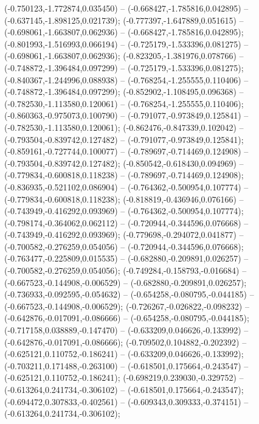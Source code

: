 (-0.750123,-1.772874,0.035450) -- (-0.668427,-1.785816,0.042895) -- (-0.637145,-1.898125,0.021739);
 (-0.777397,-1.647889,0.051615) -- (-0.698061,-1.663807,0.062936) -- (-0.668427,-1.785816,0.042895);
 (-0.801993,-1.516993,0.066194) -- (-0.725179,-1.533396,0.081275) -- (-0.698061,-1.663807,0.062936);
 (-0.823205,-1.381976,0.078766) -- (-0.748872,-1.396484,0.097299) -- (-0.725179,-1.533396,0.081275);
 (-0.840367,-1.244996,0.088938) -- (-0.768254,-1.255555,0.110406) -- (-0.748872,-1.396484,0.097299);
 (-0.852902,-1.108495,0.096368) -- (-0.782530,-1.113580,0.120061) -- (-0.768254,-1.255555,0.110406);
 (-0.860363,-0.975073,0.100790) -- (-0.791077,-0.973849,0.125841) -- (-0.782530,-1.113580,0.120061);
 (-0.862476,-0.847339,0.102042) -- (-0.793504,-0.839742,0.127482) -- (-0.791077,-0.973849,0.125841);
 (-0.859161,-0.727744,0.100077) -- (-0.789697,-0.714469,0.124908) -- (-0.793504,-0.839742,0.127482);
 (-0.850542,-0.618430,0.094969) -- (-0.779834,-0.600818,0.118238) -- (-0.789697,-0.714469,0.124908);
 (-0.836935,-0.521102,0.086904) -- (-0.764362,-0.500954,0.107774) -- (-0.779834,-0.600818,0.118238);
 (-0.818819,-0.436946,0.076166) -- (-0.743949,-0.416292,0.093969) -- (-0.764362,-0.500954,0.107774);
 (-0.798174,-0.364062,0.062112) -- (-0.720944,-0.344596,0.076668) -- (-0.743949,-0.416292,0.093969);
 (-0.779698,-0.294072,0.041877) -- (-0.700582,-0.276259,0.054056) -- (-0.720944,-0.344596,0.076668);
 (-0.763477,-0.225809,0.015535) -- (-0.682880,-0.209891,0.026257) -- (-0.700582,-0.276259,0.054056);
 (-0.749284,-0.158793,-0.016684) -- (-0.667523,-0.144908,-0.006529) -- (-0.682880,-0.209891,0.026257);
 (-0.736933,-0.092595,-0.054632) -- (-0.654258,-0.080795,-0.044185) -- (-0.667523,-0.144908,-0.006529);
 (-0.726267,-0.026822,-0.098232) -- (-0.642876,-0.017091,-0.086666) -- (-0.654258,-0.080795,-0.044185);
 (-0.717158,0.038889,-0.147470) -- (-0.633209,0.046626,-0.133992) -- (-0.642876,-0.017091,-0.086666);
 (-0.709502,0.104882,-0.202392) -- (-0.625121,0.110752,-0.186241) -- (-0.633209,0.046626,-0.133992);
 (-0.703211,0.171488,-0.263100) -- (-0.618501,0.175664,-0.243547) -- (-0.625121,0.110752,-0.186241);
 (-0.698219,0.239030,-0.329752) -- (-0.613264,0.241734,-0.306102) -- (-0.618501,0.175664,-0.243547);
 (-0.694472,0.307833,-0.402561) -- (-0.609343,0.309333,-0.374151) -- (-0.613264,0.241734,-0.306102);
